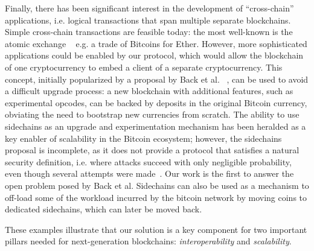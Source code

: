 Finally, there has been significant interest in the development of
``cross-chain'' applications, i.e. logical transactions that span multiple
separate blockchains. Simple cross-chain transactions are feasible today: the
most well-known is the atomic exchange ~\cite{tiernolan} e.g. a trade of
Bitcoins for Ether. However, more sophisticated applications could be enabled by
our protocol, which would allow the blockchain of one cryptocurrency to embed a
client of a separate cryptocurrency. This concept, initially popularized by a
proposal by Back et al. ~\cite{sidechains}, can be used to avoid a difficult
upgrade process: a new blockchain with additional features, such as experimental
opcodes, can be backed by deposits in the original Bitcoin currency, obviating
the need to bootstrap new currencies from scratch. The ability to use sidechains
as an upgrade and experimentation mechanism has been heralded as a key enabler
of scalability in the Bitcoin ecosystem; however, the sidechains proposal is
incomplete, as it does not provide a protocol that satisfies a natural security
definition, i.e. where attacks succeed with only negligible probability, even
though several attempts were made~\cite{pos,compactspv}. Our work is the
first to answer the open problem posed by Back et al. Sidechains can also be
used as a mechanism to off-load some of the workload incurred by the bitcoin
network by moving coins to dedicated sidechains, which can later be moved back.

These examples illustrate that our solution is a key component for two important
pillars needed for next-generation blockchains: \textit{interoperability} and
\textit{scalability}.

